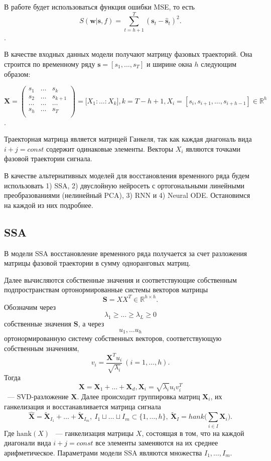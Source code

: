 \documentclass[12pt, twoside]{article}
\begin{document}
В работе будет использоваться функция ошибки MSE, то есть 
$$
S(\mathbf{w}|\mathbf{s},f) = \sum\limits_{t=h+1}^{T}(\mathbf{s}_t - \hat{\mathbf{s}}_t)^2.
$$.

В качестве входных данных модели получают матрицу фазовых траекторий. Она строится по временному ряду $\mathbf{s} = [s_1, \dots, s_{T}]$ и ширине окна $h$ следующим образом:

$\mathbf{X} = \begin{pmatrix}
s_1 & \dots & s_{k}\\
s_2 & \dots & s_{k+1}\\
\dots & \dots & \dots\\
s_{h} & \dots & s_{T}\\
\end{pmatrix} = \big[X_1 : \dots : X_k\big], k=T-h+1, X_i = [s_i, s_{i+1}, \dots, s_{i + h - 1}] \in \mathbb{R}^h$. 

Траекторная матрица является матрицей Ганкеля, так как каждая диагональ вида $i+j=const$ содержит одинаковые элементы. Векторы $X_i$ являются точками фазовой траектории сигнала. 

В качестве альтернативных моделей для восстановления временного ряда будем использовать 1) SSA, 2) двуслойную нейросеть с ортогональными линейными преобразованиями (нелинейный PCA), 3) RNN и 4) Neural ODE. Остановимся на каждой из них подробнее.

\subsection{SSA}

В модели SSA восстановление временного ряда получается за счет разложения матрицы фазовой траектории в сумму одноранговых матриц. 

Далее вычисляются собственные значения и соответствующие собственным подпространствам ортонормированные системы векторов матрицы \[\mathbf{S}=XX^T \in \mathbb{R}^{h \times h}.\] Обозначим через \[\lambda_1 \ge \dots \ge \lambda_L \ge 0\] собственные значения $\mathbf{S}$, а через \[u_1, \dots u_h\] ортонормированную систему собственных векторов, соответствующую собственным значениям, \[v_i = \frac{\mathbf{X}^Tu_i}{\sqrt{\lambda_i}} \ (i=1, \dots, h).\] Тогда \[\mathbf{X} = \mathbf{X}_1 + \dots + \mathbf{X}_d, \mathbf{X}_i = \sqrt{\lambda_i}u_iv_i^T\] ~--- SVD-разложение $\mathbf{X}$. Далее происходит группировка матриц $\mathbf{X}_i$, их ганкелизация и восстанавливается матрица сигнала \[\hat{\mathbf{X}} = \mathbf{\tilde{X}}_{I_1} + \dots + \mathbf{\tilde{X}}_{I_m}, \ I_1 \sqcup \dots \sqcup I_m \subset \{1, \dots, h\}, \ \mathbf{\tilde{X}}_{I} = hank\big(\sum\limits_{i \in I}\mathbf{X}_i\big).\] Где $\text{hank}(X)$ ~--- ганкелизация матрицы $X$, состоящая в том, что на каждой диагонали вида $i+j=const$ все элементы заменяются на их среднее арифметическое. Параметрами модели SSA являются множества $I_1, \dots, I_m$.
\end{document}
